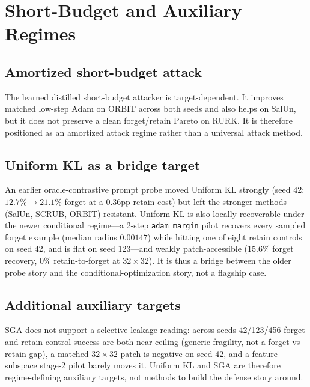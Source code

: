 \documentclass{article}
\begin{document}




\section{Short-Budget and Auxiliary Regimes}
\subsection{Amortized short-budget attack}
The learned distilled short-budget attacker is target-dependent. It improves matched low-step Adam on ORBIT across both seeds and also helps on SalUn, but it does not preserve a clean forget/retain Pareto on RURK. It is therefore positioned as an amortized attack regime rather than a universal attack method.



\subsection{Uniform KL as a bridge target}
An earlier oracle-contrastive prompt probe moved Uniform KL strongly (seed 42: $12.7\%\!\to\!21.1\%$ forget at a $0.36$pp retain cost) but left the stronger methods (SalUn, SCRUB, ORBIT) resistant. Uniform KL is also locally recoverable under the newer conditional regime---a 2-step \texttt{adam\_margin} pilot recovers every sampled forget example (median radius $0.00147$) while hitting one of eight retain controls on seed 42, and is flat on seed 123---and weakly patch-accessible ($15.6\%$ forget recovery, $0\%$ retain-to-forget at $32\times32$). It is thus a bridge between the older probe story and the conditional-optimization story, not a flagship case.

\subsection{Additional auxiliary targets}
SGA does not support a selective-leakage reading: across seeds 42/123/456 forget and retain-control success are both near ceiling (generic fragility, not a forget-vs-retain gap), a matched $32\times32$ patch is negative on seed 42, and a feature-subspace stage-2 pilot barely moves it. Uniform KL and SGA are therefore regime-defining auxiliary targets, not methods to build the defense story around.


\end{document}
